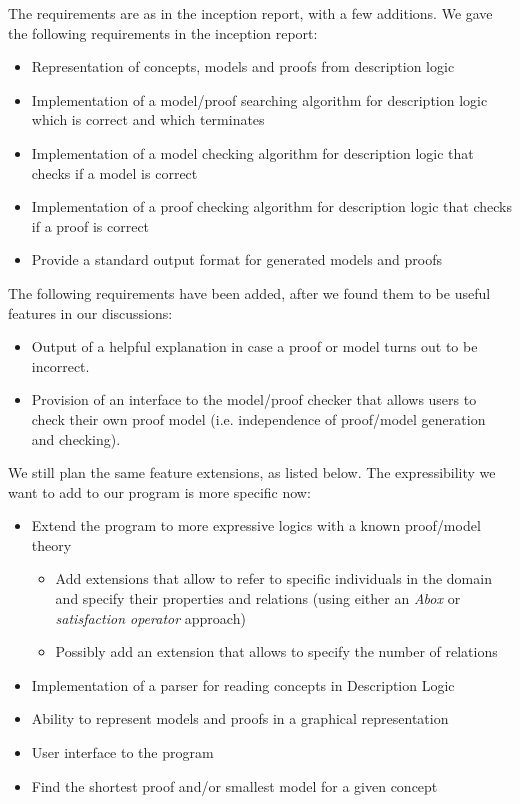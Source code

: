 The requirements are as in the inception report, with a few additions. We gave the following requirements in the inception report:
\begin{itemize}
\item Representation of concepts, models and proofs from description logic
\item Implementation of a model/proof searching algorithm for description logic which is correct and which terminates
\item Implementation of a model checking algorithm for description logic that checks
if a model is correct
\item Implementation of a proof checking algorithm for description logic that checks if a proof is correct
\item Provide a standard output format for generated models and proofs 
\end{itemize}
The following requirements have been added, after we found them to be useful features
in our discussions:
\begin{itemize}
\item Output of a helpful explanation in case a proof or model turns out to be incorrect.
\item Provision of an interface to the model/proof checker that allows users to check their own proof model (i.e. independence of proof/model generation and checking).
\end{itemize}

We still plan the same feature extensions, as listed below. The expressibility we want to
add to our program is more specific now:

\begin{itemize}
\item Extend the program to more expressive logics with a known proof/model theory
  \begin{itemize}
    \item Add extensions that allow to refer to specific individuals in the domain and
      specify their properties and relations (using either an \emph{Abox} or \emph{satisfaction operator} approach)
    \item Possibly add an extension that allows to specify the number of relations
  \end{itemize}
\item Implementation of a parser for reading concepts in Description Logic
\item Ability to represent models and proofs in a graphical representation
\item User interface to the program
\item Find the shortest proof and/or smallest model for a given concept
\end{itemize}

